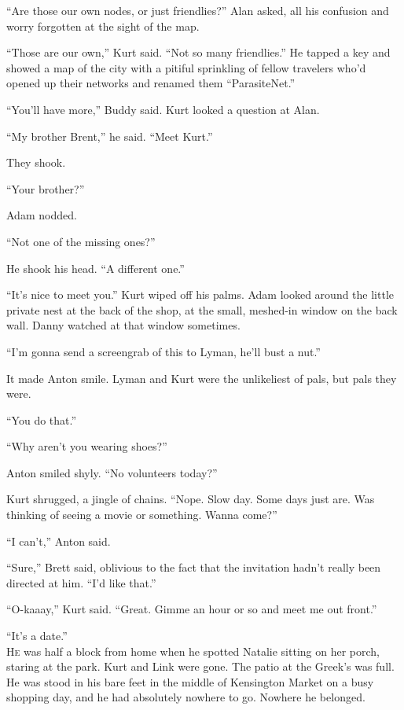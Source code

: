 ``Are those our own nodes, or just friendlies?'' Alan asked, all his
confusion and worry forgotten at the sight of the map. 

``Those are our own,'' Kurt said.  ``Not so many friendlies.'' He
tapped a key and showed a map of the city with a pitiful sprinkling of
fellow travelers who'd opened up their networks and renamed them
``ParasiteNet.''

``You'll have more,'' Buddy said.  Kurt looked a question at Alan.

``My brother Brent,'' he said.  ``Meet Kurt.''

They shook. 

``Your brother?''

Adam nodded.

``Not one of the missing ones?''

He shook his head.  ``A different one.''

``It's nice to meet you.'' Kurt wiped off his palms.  Adam looked
around the little private nest at the back of the shop, at the small,
meshed-in window on the back wall.  Danny watched at that window
sometimes.

``I'm gonna send a screengrab of this to Lyman, he'll bust a nut.''

It made Anton smile.  Lyman and Kurt were the unlikeliest of pals, but
pals they were.

``You do that.''

``Why aren't you wearing shoes?''

Anton smiled shyly.  ``No volunteers today?''

Kurt shrugged, a jingle of chains.  ``Nope.  Slow day.  Some days just
are.  Was thinking of seeing a movie or something.  Wanna come?''

``I can't,'' Anton said. 

``Sure,'' Brett said, oblivious to the fact that the invitation hadn't
really been directed at him.  ``I'd like that.''

``O-kaaay,'' Kurt said.  ``Great.  Gimme an hour or so and meet me out
front.''

``It's a date.''
\\
\lettrine[lines=3, lhang=.5, nindent=0pt, findent=2pt]{H}{e} was half a block from home when he spotted Natalie sitting on her
porch, staring at the park.  Kurt and Link were gone.  The patio at
the Greek's was full.  He was stood in his bare feet in the middle of
Kensington Market on a busy shopping day, and he had absolutely
nowhere to go.  Nowhere he belonged.

